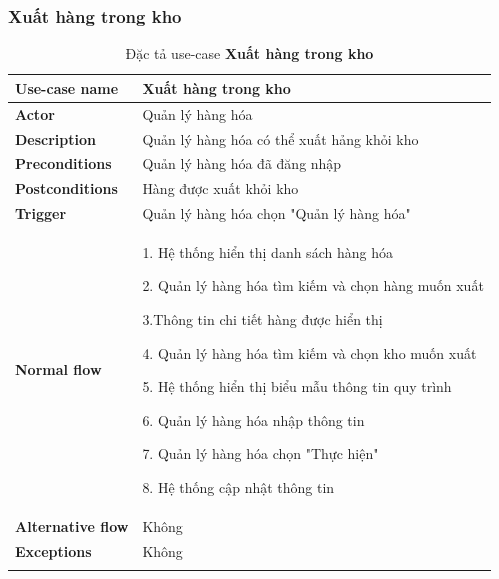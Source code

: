 \subsubsection{Xuất hàng trong kho}
{
    \setlength\extrarowheight{6pt}
    \begin{longtable}{| p{} | p{} |}
        \hline
        \textbf{Use-case name}
         &
        Xuất hàng trong kho
        \\
        \hline
        \textbf{Actor}
         &
        Quản lý hàng hóa
        \\
        \hline
        \textbf{Description}
         &
        Quản lý hàng hóa có thể xuất hảng khỏi kho
        \\
        \hline
        \textbf{Preconditions}
         &
        Quản lý hàng hóa đã đăng nhập
        \\
        \hline
        \textbf{Postconditions}
         &
        Hàng được xuất khỏi kho
        \\
        \hline
        \textbf{Trigger}
         &
        Quản lý hàng hóa chọn "Quản lý hàng hóa"
        \\
        \hline
        \begin{flushleft}
            \textbf{Normal flow}
        \end{flushleft}
         &
        1. Hệ thống hiển thị danh sách hàng hóa

        2. Quản lý hàng hóa tìm kiếm và chọn hàng muốn xuất

        3.Thông tin chi tiết hàng được hiển thị

        4. Quản lý hàng hóa tìm kiếm và chọn kho muốn xuất

        5. Hệ thống hiển thị biểu mẫu thông tin quy trình

        6. Quản lý hàng hóa nhập thông tin

        7. Quản lý hàng hóa chọn "Thực hiện"

        8. Hệ thống cập nhật thông tin
        \\
        \hline
        \textbf{Alternative flow}
         &
        Không
        \\
        \hline
        \textbf{Exceptions}
         &
        Không
        \\
        \hline
        \caption{Đặc tả use-case \textbf{Xuất hàng trong kho}}
    \end{longtable}
}


